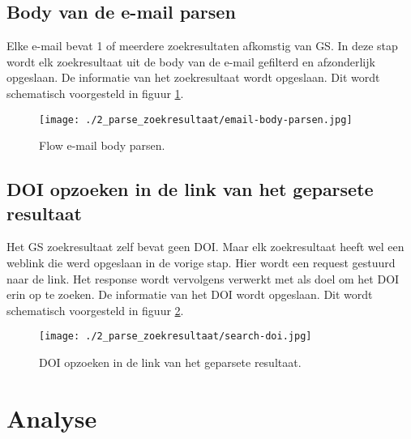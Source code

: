 \subsection{Body van de e-mail parsen}
Elke e-mail bevat 1 of meerdere zoekresultaten afkomstig van GS. In deze stap wordt elk zoekresultaat uit de body van de e-mail gefilterd en afzonderlijk opgeslaan.
De informatie van het zoekresultaat wordt opgeslaan. Dit wordt schematisch voorgesteld in figuur \ref{fig:E-mail body parsen}.
\begin{figure}[h!]
    \centering
    \texttt{[image: ./2\_parse\_zoekresultaat/email-body-parsen.jpg]}
    \caption[E-mail body parsen.]{\label{fig:E-mail body parsen}Flow e-mail body parsen.}
\end{figure}
\subsection{DOI opzoeken in de link van het geparsete resultaat}
Het GS zoekresultaat zelf bevat geen DOI. Maar elk zoekresultaat heeft wel een weblink die werd opgeslaan in de vorige stap. Hier wordt een request gestuurd naar de link. Het response wordt vervolgens verwerkt met als doel om het DOI erin op te zoeken. De informatie van het DOI wordt opgeslaan. Dit wordt schematisch voorgesteld in figuur \ref{fig:E-mail search DOI}.
\begin{figure}[h!]
    \centering
    \texttt{[image: ./2\_parse\_zoekresultaat/search-doi.jpg]}
    \caption[DOI opzoeken in de link van het geparsete resultaat.]{\label{fig:E-mail search DOI}DOI opzoeken in de link van het geparsete resultaat.}
\end{figure}
\section{Analyse}
